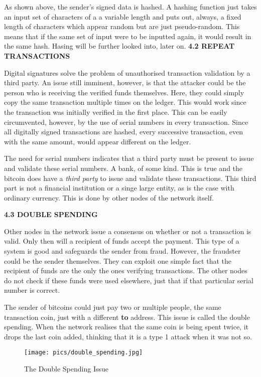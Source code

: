 \documentclass[12pt,a4paper]{report}
\begin{document}
\begin{flushleft}
As shown above, the sender's signed data is hashed. A hashing function just takes an input set of characters of a a variable length and puts out, always, a fixed length of characters which appear random but are just pseudo-random. This means that if the same set of input were to be inputted again, it would result in the same hash. Hasing will be further looked into, later on.
\newpage
\textbf{4.2 REPEAT TRANSACTIONS}
\vspace{10mm}

Digital signatures solve the problem of unauthorised transaction validation by a third party. An issue still imminent, however, is that the attacker could be the person who is receiving the verified funds themselves. Here, they could simply copy the same transaction multiple times on the ledger. This would work since the transaction was initially verified in the first place. \newline
This can be easily circumvented, however, by the use of serial numbers in every transaction. Since all digitally signed transactions are hashed, every successive transaction, even with the same amount, would appear different on the ledger.\newline

The need for serial numbers indicates that a third party must be present to issue and validate these serial numbers. A bank, of some kind. This is true and the bitcoin does have a \textit{third party} to issue and validate these transactions. This third part is not a financial institution or a singe large entity, as is the case with ordinary currency. This is done by other nodes of the network itself.

\vspace{10mm}
\textbf{4.3 DOUBLE SPENDING}
\vspace{10mm}

Other nodes in the network issue a consensus on whether or not a transaction is valid. Only then will a recipient of funds accept the payment. This type of a system is good and safeguards the sender from fraud. However, the fraudster could be the sender themselves. They can exploit one simple fact that the recipient of funds are the only the ones verifying transactions. The other nodes do not check if these funds were used elsewhere, just that if that particular serial number is correct.\newline

The sender of bitcoins could just pay two or multiple people, the same transaction coin, just with a different \textbf{to} address. This issue is called the double spending.
When the network realises that the same coin is being spent twice, it drops the last coin added, thinking that it is a type 1 attack when it was not so.
\vspace{10mm}
\begin{figure}[h]
\centering
\caption{The Double Spending Issue}
\texttt{[image: pics/double\_spending.jpg]}
\end{figure}
\vspace{10mm}


\end{flushleft}
\end{document}
